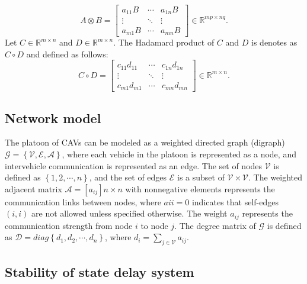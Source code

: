 \documentclass[a4paper]{cas-sc}
\begin{document}
\begin{equation*}
A \otimes B = \left[ {\begin{array}{*{20}{c}}
  {{a_{11}}B} & \cdots & {{a_{1n}}B} \\
  \vdots      & \ddots & \vdots      \\
  {{a_{m1}}B} & \cdots & {{a_{mn}}B}
\end{array}} \right] \in {\mathbb{R}^{mp \times nq}}.
\end{equation*}
Let $C \in {\mathbb{R}^{m \times n}}$ and $D \in {\mathbb{R}^{m \times n}}$. The Hadamard product of $C$ and $D$ is denotes as $C \circ D$ and defined as follows:
\begin{equation*}
C \circ D = \left[ {\begin{array}{*{20}{c}}
  {{c_{11}}{d_{11}}} & \cdots & {{c_{1n}}{d_{1n}}} \\
  \vdots             & \ddots & \vdots             \\
  {{c_{m1}}{d_{m1}}} & \cdots & {{c_{mn}}{d_{mn}}}
\end{array}} \right] \in {\mathbb{R}^{m \times n}}.
\end{equation*}

\subsection{Network model}
\label{Section 2.1}

The platoon of CAVs can be modeled as a weighted directed graph (digraph) $\mathcal{G} = \left\{ {\mathcal{V},\mathcal{E},\mathcal{A}} \right\}$, where each vehicle in the platoon is represented as a node, and intervehicle communication is represented as an edge. The set of nodes $\mathcal{V}$ is defined as $\left\{ {1,2, \cdots ,n} \right\}$, and the set of edges $\mathcal{E}$ is a subset of $\mathcal{V} \times \mathcal{V}$. The weighted adjacent matrix $\mathcal{A} = {[{a_{ij}}]{n \times n}}$ with nonnegative elements represents the communication links between nodes, where ${a{ii}} = 0$ indicates that self-edges $\left( {i,i} \right)$ are not allowed unless specified otherwise. The weight ${a_{ij}}$ represents the communication strength from node $i$ to node $j$. The degree matrix of $\mathcal{G}$ is defined as $\mathcal{D} = diag\left\{ {{d_1},{d_2}, \cdots ,{d_n}} \right\}$, where ${d_i} = \sum\limits_{j \in \mathcal{V}} {{a_{ij}}}$.




\subsection{Stability of state delay system}
\label{Section 2.2}
\end{document}
